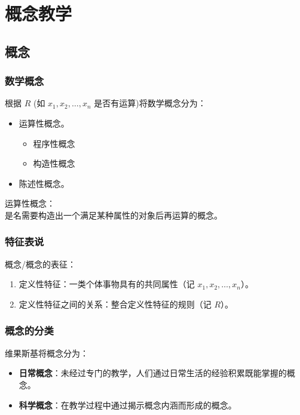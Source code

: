\chapter{概念教学}

\section{概念}
\begin{multicols}{2}
\subsection{数学概念}
根据 $R$ (如 $x_1, x_2, \ldots, x_n$ 是否有运算)将数学概念分为：
\begin{itemize}
    \item 运算性概念。
    \begin{itemize}
        \item 程序性概念
        \item 构造性概念
    \end{itemize}
    \item 陈述性概念。
\end{itemize}
运算性概念：\\
是名需要构造出一个满足某种属性的对象后再运算的概念。
\columnbreak
\subsection{特征表说}
概念/概念的表征：
\begin{enumerate}
    \item 定义性特征：一类个体事物具有的共同属性（记 $x_1, x_2, \ldots, x_n$）。
    \item 定义性特征之间的关系：整合定义性特征的规则（记 $R$）。
\end{enumerate}

\subsection{概念的分类}
维果斯基将概念分为：
\begin{itemize}
    \item \textbf{日常概念}：未经过专门的教学，人们通过日常生活的经验积累既能掌握的概念。
    \item \textbf{科学概念}：在教学过程中通过揭示概念内涵而形成的概念。
\end{itemize}
\end{multicols}

